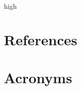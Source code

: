 high\documentclass[SE,lsstdraft,authoryear,toc]{lsstdoc}
\begin{document}
\section{References} \label{sec:bib}
\renewcommand{\refname}{} %


\section{Acronyms} \label{sec:acronyms}

\end{document}
